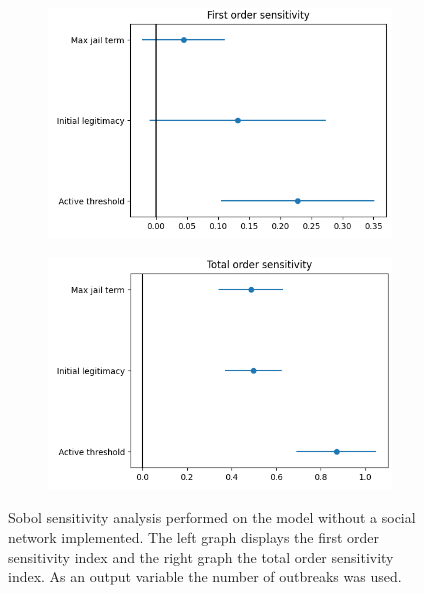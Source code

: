 \documentclass[10pt]{article}
\begin{document}
    \begin{figure}[h!]
        \centering
        \begin{subfigure}[b]{.45\linewidth}
            \includegraphics[width=\textwidth]{pictures/Sensitivity_analysis/Global SA_first2.png}
            \label{fig:global_sa_first order}
        \end{subfigure}\hspace{5mm}
        \begin{subfigure}[b]{.45\linewidth}
            \includegraphics[width=\textwidth]{pictures/Sensitivity_analysis/Global SA_total2.png}
            \label{fig:to_SA}
        \end{subfigure}
        \captionsetup{width=0.9\linewidth}
        \caption{Sobol sensitivity analysis performed on the model without a social network implemented. The left graph displays the first order sensitivity index and the right graph the total order sensitivity index. As an output variable the number of outbreaks was used.}
        \label{fig:global_sa}
    \end{figure}
\end{document}

